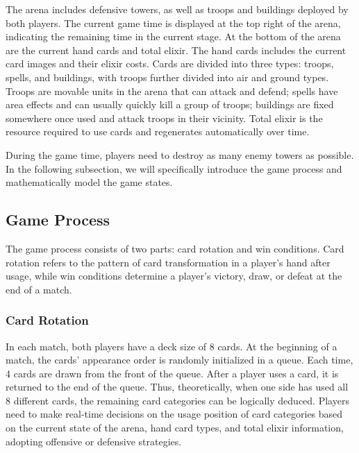 \documentclass[runningheads]{llncs}
\begin{document}
The arena includes defensive towers, as well as troops and buildings deployed by both players.
The current game time is displayed at the top right of the arena, indicating the remaining time in the current stage.
At the bottom of the arena are the current hand cards and total elixir.
The hand cards includes the current card images and their elixir costs.
Cards are divided into three types: troops, spells, and buildings, with troops further divided into air and ground types.
Troops are movable units in the arena that can attack and defend;
spells have area effects and can usually quickly kill a group of troops;
buildings are fixed somewhere once used and attack troops in their vicinity.
Total elixir is the resource required to use cards and regenerates automatically over time.

During the game time, players need to destroy as many enemy towers as possible.
In the following subsection, we will specifically introduce the game process
and mathematically model the game states.
\subsection{Game Process}
The game process consists of two parts: card rotation and win conditions.
Card rotation refers to the pattern of card transformation in a player's hand after usage,
while win conditions determine a player's victory, draw, or defeat at the end of a match.

\subsubsection{Card Rotation}
In each match, both players have a deck size of 8 cards. At the beginning of a match,
the cards' appearance order is randomly initialized in a queue. Each time,
4 cards are drawn from the front of the queue. After a player uses a card,
it is returned to the end of the queue. Thus, theoretically, when one side has used all 8 different cards,
the remaining card categories can be logically deduced.
Players need to make real-time decisions on the usage position of card categories based on the current state of the arena,
hand card types, and total elixir information, adopting offensive or defensive strategies.
\end{document}
